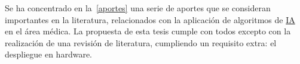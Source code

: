 Se ha concentrado en la~\autoref{aportes} una serie de aportes que se consideran
importantes en la literatura, relacionados con la aplicación de algoritmos de
\hyperlink{abbr}{IA} en el área médica. La propuesta de esta tesis cumple con
todos excepto con la realización de una revisión de literatura, cumpliendo un
requisito extra: el despliegue en hardware.

\begin{table}[H]
    \centering
    \caption{Aportes y sus contribuciones}\label{aportes}
\end{table}

